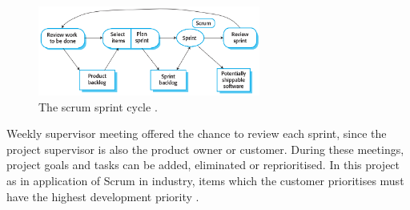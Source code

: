 \begin{figure}[H]
    \centering
    \includegraphics[width=0.65\textwidth]{6swengprocess/images/scrum.png}
    \caption{The scrum sprint cycle \cite{sommerville}.}
    \label{fig:scrum}
\end{figure}

Weekly supervisor meeting offered the chance to review each sprint, since the project supervisor is also the product owner or customer. During these meetings, project goals and tasks can be added, eliminated or reprioritised. In this project as in application of Scrum in industry, items which the customer prioritises must have the highest development priority \cite{scrum}.